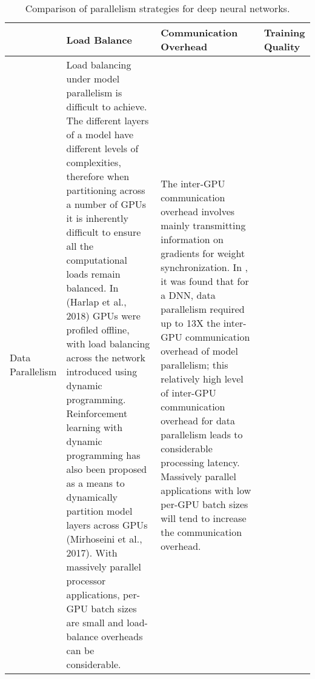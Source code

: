 \documentclass[10pt]{article}[draft]
\newlength\mylen
\begin{document}
\begin{table}[htbpp]
	\small
	\setlength\tabcolsep{3pt} %
	\captionsetup{font=small,skip=0.333\baselineskip}
	\caption{Comparison of parallelism strategies for deep neural networks.} \label{T2.6}

	\begin{center}
	\begin{tabularx}{\textwidth}{@{} p{\mylen} LLL @{}}
		\toprule
		& 
		Load Balance  & 
		Communication Overhead& 
		Training Quality \\ 
		\midrule
		Data Parallelism & 
		Load balancing under model parallelism is difficult to achieve. The different layers of a model have different levels of complexities, therefore  when partitioning across a number of GPUs it is inherently difficult to ensure all the computational loads remain balanced. In (Harlap et al., 2018)  GPUs were profiled offline, with load balancing  across the network   introduced  using dynamic programming.  Reinforcement learning with dynamic programming has  also been proposed as a means to  dynamically partition  model layers across GPUs (Mirhoseini et al., 2017). With massively parallel processor applications, per-GPU batch sizes are small and load-balance overheads can be considerable. & 
		The inter-GPU communication overhead involves mainly transmitting information on  gradients for weight synchronization. In \cite{https://arxiv.org/pdf/1809.02839.pdf}, it was found that for a DNN, data parallelism required up to 13X the inter-GPU communication overhead of model parallelism; this relatively high level of inter-GPU communication overhead for data parallelism
		leads to considerable processing latency. Massively parallel applications with low per-GPU batch sizes will tend to increase the communication overhead.
		

\end{tabularx}
\end{center}
\end{table}
\end{document}
